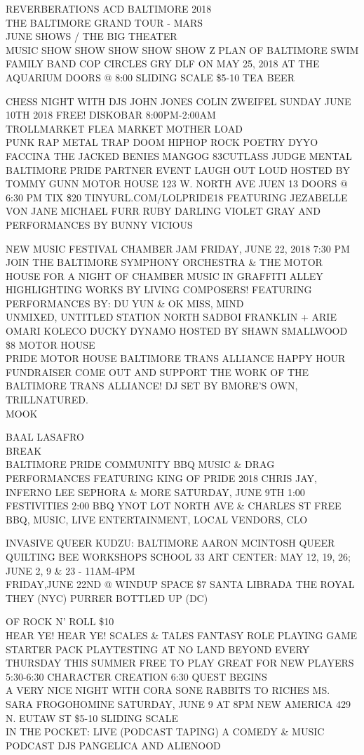 \documentclass[10pt,letterpaper]{article}
\begin{document}
REVERBERATIONS ACD BALTIMORE 2018\\
THE BALTIMORE GRAND TOUR {-} MARS\\
JUNE SHOWS / THE BIG THEATER\\
MUSIC SHOW SHOW SHOW SHOW SHOW Z PLAN OF BALTIMORE SWIM FAMILY BAND COP CIRCLES GRY DLF ON MAY 25, 2018 AT THE AQUARIUM DOORS @ 8:00 SLIDING SCALE \$5{-}10 TEA BEER

CHESS NIGHT WITH DJS JOHN JONES COLIN ZWEIFEL SUNDAY JUNE 10TH 2018 FREE!  DISKOBAR 8:00PM{-}2:00AM\\
TROLLMARKET FLEA MARKET MOTHER LOAD\\
PUNK RAP METAL TRAP DOOM HIPHOP ROCK POETRY DYYO FACCINA THE JACKED BENIES MANGOG 83CUTLASS JUDGE MENTAL\\
BALTIMORE PRIDE PARTNER EVENT LAUGH OUT LOUD HOSTED BY TOMMY GUNN MOTOR HOUSE 123 W. NORTH AVE JUEN 13 DOORS @ 6:30 PM TIX \$20 TINYURL.COM/LOLPRIDE18 FEATURING JEZABELLE VON JANE MICHAEL FURR RUBY DARLING VIOLET GRAY AND PERFORMANCES BY BUNNY VICIOUS

NEW MUSIC FESTIVAL CHAMBER JAM FRIDAY, JUNE 22, 2018 7:30 PM JOIN THE BALTIMORE SYMPHONY ORCHESTRA \& THE MOTOR HOUSE FOR A NIGHT OF CHAMBER MUSIC IN GRAFFITI ALLEY HIGHLIGHTING WORKS BY LIVING COMPOSERS!  FEATURING PERFORMANCES BY: DU YUN \& OK MISS, MIND\\
UNMIXED, UNTITLED STATION NORTH SADBOI FRANKLIN + ARIE OMARI KOLECO DUCKY DYNAMO HOSTED BY SHAWN SMALLWOOD \$8 MOTOR HOUSE\\
PRIDE MOTOR HOUSE BALTIMORE TRANS ALLIANCE HAPPY HOUR FUNDRAISER COME OUT AND SUPPORT THE WORK OF THE BALTIMORE TRANS ALLIANCE!  DJ SET BY BMORE'S OWN, TRILLNATURED.\\
MOOK

BAAL LASAFRO\\
BREAK\\
BALTIMORE PRIDE COMMUNITY BBQ MUSIC \& DRAG PERFORMANCES FEATURING KING OF PRIDE 2018 CHRIS JAY, INFERNO LEE SEPHORA \& MORE SATURDAY, JUNE 9TH 1:00 FESTIVITIES 2:00 BBQ YNOT LOT NORTH AVE \& CHARLES ST FREE BBQ, MUSIC, LIVE ENTERTAINMENT, LOCAL VENDORS, CLO

INVASIVE QUEER KUDZU: BALTIMORE AARON MCINTOSH QUEER QUILTING BEE WORKSHOPS SCHOOL 33 ART CENTER: MAY 12, 19, 26; JUNE 2, 9 \& 23 {-} 11AM{-}4PM\\
FRIDAY,JUNE 22ND @ WINDUP SPACE \$7 SANTA LIBRADA THE ROYAL THEY (NYC) PURRER BOTTLED UP (DC)

OF ROCK N' ROLL \$10\\
HEAR YE!  HEAR YE!  SCALES \& TALES FANTASY ROLE PLAYING GAME STARTER PACK PLAYTESTING AT NO LAND BEYOND EVERY THURSDAY THIS SUMMER FREE TO PLAY GREAT FOR NEW PLAYERS 5:30{-}6:30 CHARACTER CREATION 6:30 QUEST BEGINS\\
A VERY NICE NIGHT WITH CORA SONE RABBITS TO RICHES MS. SARA FROGOHOMINE SATURDAY, JUNE 9 AT 8PM NEW AMERICA 429 N. EUTAW ST \$5{-}10 SLIDING SCALE\\
IN THE POCKET: LIVE (PODCAST TAPING) A COMEDY \& MUSIC PODCAST DJS PANGELICA AND ALIENOOD
\end{document}
